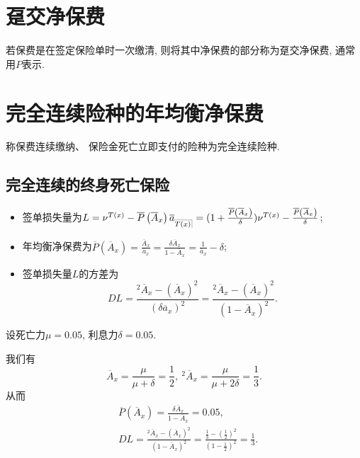 \documentclass[lang=cn,10pt]{elegantbook}
\makeatletter
\DeclareRobustCommand{\annu}[1]{_{%
    \def\arraystretch{0}%
    \setlength\arraycolsep{1pt}%
    \setlength\arrayrulewidth{.2pt}%
    \begin{array}[b]{@{}c|}\hline
        \\[\arraycolsep]%
        \scriptstyle #1%
    \end{array}%
}}
\makeatother
\begin{document}
\section{趸交净保费}
\begin{definition}[趸交净保费]
    若保费是在签定保险单时一次缴清, 则将其中净保费的部分称为趸交净保费, 通常用$P$表示.
\end{definition}

\section{完全连续险种的年均衡净保费}
\begin{definition}
    称保费连续缴纳、 保险金死亡立即支付的险种为完全连续险种.
\end{definition}
\subsection{完全连续的终身死亡保险}
\begin{proposition}
    \begin{itemize}
        \item 签单损失量为$L=\nu^{T(x)}-\overline{P}\left( \overline{A}_x \right)\overline a_{\annu {T(x)}}=(1+\frac{\overline{P}\left( \overline{A}_x \right)}{\delta})\nu^{T(x)}-\frac{\overline{P}\left( \overline{A}_x \right)}{\delta}$;
        \item 年均衡净保费为$\overline{P}\left( \overline{A}_x \right)=\frac{\overline A_x}{\overline a_x}=\frac{\delta\overline A_x}{1-\overline A_x}=\frac{1}{\overline a_x}-\delta$;
        \item 签单损失量$L$的方差为
$$DL=\frac{^2\overline A_x-(\overline A_x)^2}{(\delta\overline a_x)^2}=\frac{^2\overline A_x-(\overline A_x)^2}{(1-\overline A_x)^2}.$$
    \end{itemize}
\end{proposition}

\begin{example}
    设死亡力$\mu=0.05$, 利息力$\delta=0.05.$
 \end{example}
 \begin{solution}
    我们有
 $$\overline A_x=\frac{\mu}{\mu+\delta}=\frac{1}{2},\ {}^2\overline A_x=\frac{\mu}{\mu+2\delta}=\frac{1}{3}.$$
 从而
 \begin{align*}
   &\overline{P}\left( \overline{A}_x \right)=\frac{\delta\overline A_x}{1-\overline A_x}=0.05,\\
 &DL=\frac{^2\overline A_x-(\overline A_x)^2}{(1-\overline A_x)^2}=\frac{\frac{1}{3}-(\frac{1}{2})^2}{(1-\frac{1}{2})^2}=\frac{1}{3}.
 \end{align*}

\end{solution}
\end{document}
